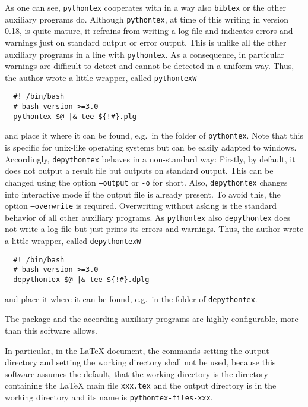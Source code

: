 As one can see, \texttt{pythontex} cooperates with \lualatex{} in a way 
also \texttt{bibtex} or the other auxiliary programs do. 
Although \texttt{pythontex}, at time of this writing in version 0.18, 
is quite mature, it refrains from writing a log file and indicates errors and warnings 
just on standard output or error output. 
This is unlike all the other auxiliary programs in a line with \texttt{pythontex}. 
As a consequence, in particular warnings are difficult to detect 
and cannot be detected in a uniform way. 
Thus, the author wrote a little wrapper, called \texttt{pythontexW} 
%
\begin{verbatim}
  #! /bin/bash
  # bash version >=3.0
  pythontex $@ |& tee ${!#}.plg  
\end{verbatim}
%
and place it where it can be found, e.g.~in the folder of \texttt{pythontex}. 
Note that this is specific for unix-like operating systems 
but can be easily adapted to windows. 
Accordingly, \texttt{depythontex} behaves in a non-standard way: 
Firstly, by default, it does not output a result file but outputs on standard output. 
This can be changed using the option \texttt{--output} or \texttt{-o} for short. 
Also, \texttt{depythontex} changes into interactive mode 
if the output file is already present. 
To avoid this, the option \texttt{--overwrite} is required. 
Overwriting without asking is the standard behavior of all other auxiliary programs. 
As \texttt{pythontex} also \texttt{depythontex} does not write a log file 
but just prints its errors and warnings. 
Thus, the author wrote a little wrapper, called \texttt{depythontexW} 
%
\begin{verbatim}
  #! /bin/bash
  # bash version >=3.0
  depythontex $@ |& tee ${!#}.dplg  
\end{verbatim}
%
and place it where it can be found, e.g.~in the folder of \texttt{depythontex}. 
\medskip


The package  and the according auxiliary programs are highly configurable, 
more than this software allows. 

In particular, in the \LaTeX{} document, 
the commands  setting the output directory 
and  setting the working directory shall not be used, 
because this software assumes the default, that the working directory is the directory 
containing the \LaTeX{} main file \texttt{xxx.tex}
and the output directory is in the working directory 
and its name is \texttt{pythontex-files-xxx}. 

